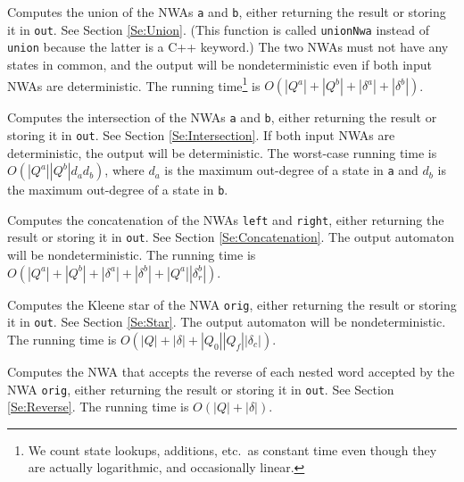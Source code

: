 \begin{functionlist}

    Computes the union of the NWAs \texttt{a} and \texttt{b},
    either returning the result or storing it in \texttt{out}.
    See Section
    \ref{Se:Union}. (This function is called \texttt{unionNwa} instead of
    \texttt{union} because the latter is a C++ keyword.) The two NWAs must not
    have any states in common, and the output will be nondeterministic even
    if both input NWAs are deterministic. The running time\footnote{We count
      state lookups, additions, etc.\ as constant time even though they are
      actually logarithmic, and occasionally linear.} is
    $O(|Q^a|+|Q^b|+|\delta^a|+|\delta^b|)$.

    Computes the intersection of the NWAs \texttt{a} and \texttt{b},
    either returning the result or storing it in \texttt{out}.
    See Section \ref{Se:Intersection}. If both input NWAs are deterministic,
    the output will be deterministic. The worst-case running time is
    $O(|Q^a| |Q^b| d_a d_b)$, where $d_a$ is the maximum out-degree
    of a state in \texttt{a} and $d_b$ is the maximum out-degree of a state
    in \texttt{b}.

    Computes the concatenation of the NWAs \texttt{left} and
    \texttt{right}, either returning the result or storing it in
    \texttt{out}.
    See Section \ref{Se:Concatenation}. The output automaton will be
    nondeterministic. The running time is
    $O(|Q^a|+|Q^b|+|\delta^a|+|\delta^b|+|Q^a||\delta_r^b|)$.

    Computes the Kleene star of the NWA \texttt{orig}, either
    returning the result or storing it in \texttt{out}. See Section
    \ref{Se:Star}. The output automaton will be nondeterministic. The
    running time is $O(|Q|+|\delta|+|Q_0||Q_f||\delta_c|)$.

    Computes the NWA that accepts the reverse of each nested word
    accepted by the NWA \texttt{orig}, either returning the result or
    storing it in \texttt{out}. See Section \ref{Se:Reverse}. The running
    time is $O(|Q|+|\delta|)$.


\end{functionlist}

